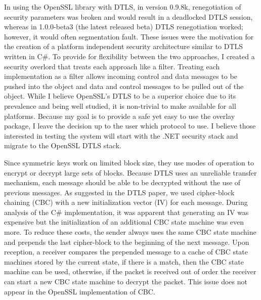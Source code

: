 In using the OpenSSL library with DTLS, in version 0.9.8k, renegotiation of
security parameters  was broken and would result in a deadlocked DTLS session,
whereas in 1.0.0-beta3 (the latest released beta) DTLS renegotiation worked;
however, it would often segmentation fault.  These issues were the motivation
for the creation of a platform independent security architecture similar to
DTLS written in C\#.  To provide for flexibility between the two approaches,
I created a security overlord that treats each approach like a filter.
Treating each implementation as a filter allows incoming control and data
messages to be pushed into the object and data and control messages to be
pulled out of the object.  While I believe OpenSSL's DTLS to be a superior
choice due to its prevalence and being well studied, it is non-trivial to make
available for all platforms.  Because my goal is to provide a safe yet easy to
use the overlay package, I leave the decision up to the user which protocol to
use.   I believe those interested in testing the system will start with the
.NET security stack and migrate to the OpenSSL DTLS stack.



Since symmetric keys work on limited block size, they use modes of operation
to encrypt or decrypt large sets of blocks.  Because DTLS uses an unreliable
transfer mechanism, each message should be able to be decrypted without the use
of previous messages.  As suggested in the DTLS paper, we used cipher-block
chaining (CBC) with a new initialization vector (IV) for each message.  During
analysis of the C\# implementation, it was apparent that generating an IV was
expensive but the initialization of an additional CBC state machine was even
more.  To reduce these costs, the sender always uses the same CBC state machine
and prepends the last cipher-block to the beginning of the next message.  Upon
reception, a receiver compares the prepended message to a cache of CBC state
machines stored by the current state, if there is a match, then the CBC state
machine can be used, otherwise, if the packet is received out of order the
receiver can start a new CBC state machine to decrypt the packet.  This issue
does not appear in the OpenSSL implementation of CBC.

